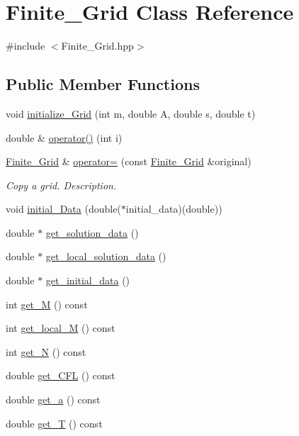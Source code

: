 \hypertarget{classFinite__Grid}{\section{Finite\-\_\-\-Grid Class Reference}
\label{classFinite__Grid}
}


{\ttfamily \#include $<$Finite\-\_\-\-Grid.\-hpp$>$}

\subsection*{Public Member Functions}
\begin{DoxyCompactItemize}
\item 
void \hyperlink{classFinite__Grid_aaa50925d3700478faea3e457e817822e}{initialize\-\_\-\-Grid} (int m, double A, double s, double t)
\item 
double \& \hyperlink{classFinite__Grid_a9c1d32863310a92669c59cd7e943f93c}{operator()} (int i)
\item 
\hyperlink{classFinite__Grid}{Finite\-\_\-\-Grid} \& \hyperlink{classFinite__Grid_a8cd3ad54b7bad81251c53b6bfeeb5e59}{operator=} (const \hyperlink{classFinite__Grid}{Finite\-\_\-\-Grid} \&original)
\begin{DoxyCompactList}\small\item\em Copy a grid. Description. \end{DoxyCompactList}\item 
void \hyperlink{classFinite__Grid_af682ebd228fc0e5b4f22f550925c37f1}{initial\-\_\-\-Data} (double($\ast$initial\-\_\-data)(double))
\item 
double $\ast$ \hyperlink{classFinite__Grid_a0a9fdd900f6367f1b24e1b706d91e8ea}{get\-\_\-solution\-\_\-data} ()
\item 
double $\ast$ \hyperlink{classFinite__Grid_ab508463cffaa3df669f5f3438434f5f2}{get\-\_\-local\-\_\-solution\-\_\-data} ()
\item 
double $\ast$ \hyperlink{classFinite__Grid_a0d78457b64e774bcec965b6f8e07ba19}{get\-\_\-initial\-\_\-data} ()
\item 
int \hyperlink{classFinite__Grid_a1fe5926edc3e29a32a06f311703147ff}{get\-\_\-\-M} () const 
\item 
int \hyperlink{classFinite__Grid_aa5da5f79ab983bf1ee6e0affb1f9b3a6}{get\-\_\-local\-\_\-\-M} () const 
\item 
int \hyperlink{classFinite__Grid_a17048cc7253f7d0349b0b6092b6d516e}{get\-\_\-\-N} () const 
\item 
double \hyperlink{classFinite__Grid_a22186597e53e379de7250b8f1a573d7b}{get\-\_\-\-C\-F\-L} () const 
\item 
double \hyperlink{classFinite__Grid_aa7592683c6e4209bf963b3d86592ea70}{get\-\_\-a} () const 
\item 
double \hyperlink{classFinite__Grid_a3480e3cdfcc4b6aa6e0fd92140f2a830}{get\-\_\-\-T} () const 
\end{DoxyCompactItemize}
